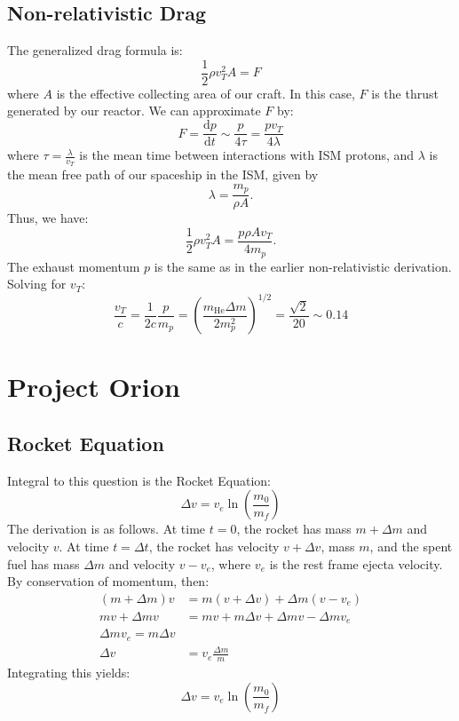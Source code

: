 \documentclass[a4paper]{article}
\def\mhe{m_{\mathrm{He}}}
\begin{document}
    \subsection{Non-relativistic Drag}
      The generalized drag formula is:
      \begin{equation}
          \frac{1}{2}\rho v_{T}^{2}A = F
      \end{equation}
      where $A$ is the effective collecting area of our craft.  In this case, $F$ is the thrust generated by our reactor.  We can approximate $F$ by:
      \begin{equation}
          F = \frac{\mathrm{d}p}{\mathrm{d}t} \sim \frac{p}{4\tau} = \frac{pv_{T}}{4\lambda}
      \end{equation}
      where $\tau = \frac{\lambda}{v_{T}}$ is the mean time between interactions with ISM protons, and $\lambda$ is the mean free path of our spaceship in the ISM, given by
      \begin{equation}
          \lambda = \frac{m_{p}}{\rho A}.
      \end{equation}
      Thus, we have:
      \begin{equation}
          \frac{1}{2}\rho v_{T}^{2}A = \frac{p\rho Av_{T}}{4m_{p}}.
      \end{equation}
      The exhaust momentum $p$ is the same as in the earlier non-relativistic derivation.  Solving for $v_{T}$:
      \begin{equation}
          \frac{v_{T}}{c} = \frac{1}{2c}\frac{p}{m_{p}} = \left(\frac{\mhe\Delta m}{2m_{p}^{2}}\right)^{1/2} = \frac{\sqrt{2}}{20} \sim 0.14
      \end{equation}
    
  \section{Project Orion}
    \subsection{Rocket Equation}
    Integral to this question is the Rocket Equation:
    \begin{equation}
      \Delta v = v_{e}\ln\left(\frac{m_{0}}{m_{f}}\right)
    \end{equation}
    The derivation is as follows.  At time $t=0$, the rocket has mass $m+\Delta m$ and velocity $v$.  At time $t=\Delta t$, the rocket has velocity $v+\Delta v$, mass $m$, and the spent fuel has mass $\Delta m$ and velocity $v-v_{e}$, where $v_{e}$ is the rest frame ejecta velocity.  By conservation of momentum, then:
    \begin{align}
      (m+\Delta m)v &= m(v+\Delta v) + \Delta m (v-v_{e})\\
      mv + \Delta m v &= mv + m\Delta v + \Delta m v - \Delta mv_{e}\\
      \Delta m v_{e} = m\Delta v\\
      \Delta v &= v_{e}\frac{\Delta m}{m}
    \end{align}
    Integrating this yields:
    \begin{equation}
     \Delta v = v_{e}\ln\left(\frac{m_{0}}{m_{f}}\right)
    \end{equation}
    
\end{document}
